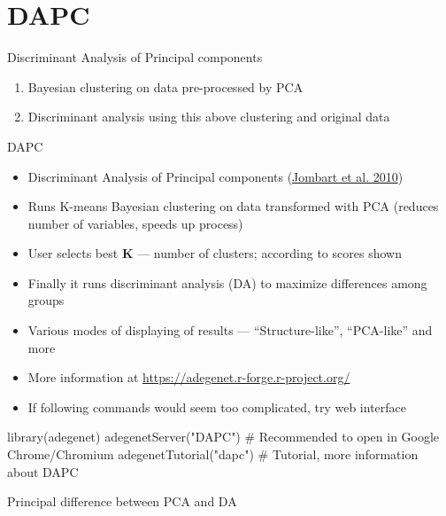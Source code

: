 \documentclass[compress, xelatex, 11pt, xcolor=svgnames, aspectratio=169,
	hyperref={
		bookmarks=true,
		unicode=true,
		colorlinks=true,
		pdftitle={Molecular data in R},
		plainpages=false,
		pdfauthor={Vojtech Zeisek},
		pdfsubject={Course about phylogeny and evolution in R},
		pdfcreator={XeLaTeX},
		pdfkeywords={R, evolution, phylogeny, molecular data},
		linkcolor=Crimson, %
		anchorcolor=Magenta, %
		citecolor=Magenta, %
		filecolor=Magenta, %
		menucolor=Magenta, %
		urlcolor=DodgerBlue, %
		},
	url={hyphens, lowtilde} %
	]{beamer}
\renewcommand{\texttt}[1]{\colorbox{Beige}{{\ttfamily #1}}}
\begin{document}
\section{DAPC}

\begin{frame}{Discriminant Analysis of Principal components}
	\tableofcontents[currentsection, sectionstyle=show/hide, hideothersubsections]
	\begin{enumerate}
		\item Bayesian clustering on data pre-processed by PCA
		\item Discriminant analysis using this above clustering and original data
	\end{enumerate}
\end{frame}

\begin{frame}[fragile]{DAPC}
	\label{DAPC}
	\begin{itemize}
		\item Discriminant Analysis of Principal components (\href{https://bmcgenet.biomedcentral.com/articles/10.1186/1471-2156-11-94}{Jombart et al. 2010})
		\item Runs K-means Bayesian clustering on data transformed with PCA (reduces number of variables, speeds up process)
		\item User selects best \textbf{K} --- number of clusters; according to scores shown
		\item Finally it runs discriminant analysis (DA) to maximize differences among groups
		\item Various modes of displaying of results --- \enquote{Structure-like}, \enquote{PCA-like} and more
		\item More information at \url{https://adegenet.r-forge.r-project.org/}
		\item If following commands would seem too complicated, try web interface
	\end{itemize}
	\begin{spluscode}
    library(adegenet)
    adegenetServer("DAPC") # Recommended to open in Google Chrome/Chromium
    adegenetTutorial("dapc") # Tutorial, more information about DAPC
	\end{spluscode}
\end{frame}

\begin{frame}{Principal difference between PCA and DA}
	\begin{center}
		\texttt{[image: dapc-da-pca.png]}
	\end{center}
\end{frame}
\end{document}
